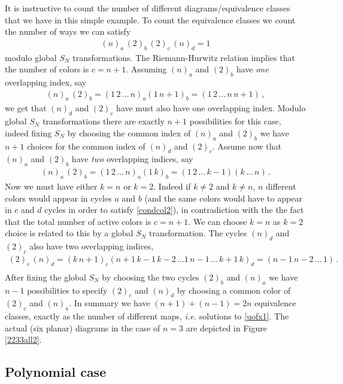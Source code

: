 \documentclass[letterpaper]{JHEP3}
\def\be{\begin{equation}}
\def\ee{\end{equation}}
\def\be{\begin{eqnarray}}
\def\ee{\end{eqnarray}}
\begin{document}
It is instructive to count the number of different diagrams/equivalence classes that we have in this simple example.
To count the equivalence classes we  count the number of ways we can satisfy 
\be\label{condcol2}
(n)_a\,(2)_b\,(2)_c \,(n)_d =1 
\ee modulo global $S_N$ transformations. The Riemann-Hurwitz relation implies that the number of  colors
 is $c=n+1$. Assuming $(n)_a$ and $(2)_b$ have {\it one} overlapping index, say
\be
(n)_a\,(2)_b=(1\, 2\,\dots\, n)_a(1 \, n+1)_b=(1\, 2\,\dots\, n\, n+1) \, ,
\ee  we get that $(n)_d$ and $(2)_c$ have must also have { one} overlapping index. Modulo global $S_N$ 
transformations there are exactly $n+1$ possibilities for this case, indeed
 fixing $S_N$ by choosing the common
 index of  $(n)_a$ and $(2)_b$ we have $n+1$ choices for the common index of $(n)_d$ and $(2)_c$. 
Assume now that $(n)_a$ and $(2)_b$ have {\it  two} overlapping indices, say
\be
(n)_a\,(2)_b=(1\, 2\,\dots\, n)_a(1 \, k)_b=(1\, 2\,\dots\, k-1)(k\,\dots\,n) \,.
\ee 
Now we must have either $k = n$ or $k=2$. Indeed if $k \neq 2$ and $k \neq n$,  $n$ different colors would appear in cycles $a$ and $b$ (and 
the same colors would have to appear in $c$ and $d$
cycles in order to satisfy \eqref{condcol2}),  in contradiction with the the fact that the total number of active colors is $c=n+1$. We can choose
 $k=n$ as $k=2$ choice is related to this by a global $S_N$ transformation.  The cycles $(n)_d$ and $(2)_c$ also have two overlapping indices,
\be
(2)_c\,(n)_d=(k\, n+1)_c(n+1\,k-1\,k-2 \,\dots 1\, n-1\, \dots\,k+1\, k)_d =(n-1\, n-2\,\dots\, 1)\,.\nonumber\\ 
\ee  After fixing the global $S_N$ by choosing the two cycles $(2)_b$ and $(n)_a$ we have $n-1$ possibilities
to specify $(2)_c$ and $(n)_d$ by choosing a common color of $(2)_c$ and  $(n)_a$.
In summary we have $(n+1)+(n-1)=2n$ equivalence classes, exactly as the number of different maps, {\it i.e.}
solutions to \eqref{uofx1}. The actual (six planar)  diagrams in the case of $n=3$ are depicted in Figure \ref{2233all2}.


\subsection{Polynomial case}\label{extremcasesec}
\end{document}
